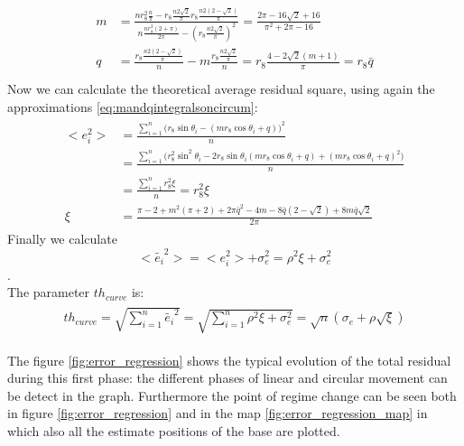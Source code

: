 \begin{itemize}
\begin{itemize}
\begin{align}
\begin{split}
m &= \frac{nr_{8}^2\frac{n}{\pi} - r_{8}\frac{n2\sqrt{2}}{\pi} r_{8}\frac{n2(2-\sqrt{2})}{\pi} }{n\frac{nr_{8}^2(2+\pi)}{2\pi} -(r_{8}\frac{n2\sqrt{2}}{\pi})^2} = \frac{2\pi - 16\sqrt{2} + 16}{\pi^2 + 2\pi - 16}  \\
q &= \frac{ r_{8}\frac{n2(2-\sqrt{2})}{\pi} }{n} - m\frac{ r_{8}\frac{n2\sqrt{2}}{\pi}}{n} = r_{8} \frac{4-2\sqrt{2}(m+1)}{\pi} = r_{8}\bar{q} \\
\end{split}
\label{eq:mandqcirum}
\end{align}
Now we can calculate the theoretical average residual square, using again the approximations  \ref{eq:mandqintegralsoncircum}:
\begin{align*}
\begin{split}
<e_i^2> &= \frac{\sum_{i = 1}^{n}{\Big(r_{8}\sin{\theta_i} - (mr_{8}\cos{\theta_i} + q)\Big)^2}}{n}\\
&= \frac{\sum_{i = 1}^{n}{\Big(r_{8}^2\sin^2{\theta_i} - 2r_{8}\sin{\theta_i}(mr_{8}\cos{\theta_i} + q) + (mr_{8}\cos{\theta_i} + q)^2\Big)}}{n}\\
& = \frac{\sum_{i = 1}^{n} r_{8}^2 \xi }{n} = r_{8}^2 \xi \\
\xi &= \frac{\pi - 2 + m^2(\pi+2) + 2\pi\bar{q}^2 - 4m -8\bar{q}(2-\sqrt{2}) + 8m\bar{q}\sqrt{2}}{2\pi}
\end{split}
\end{align*} 
Finally we calculate $$<\tilde{e_i}^2>  = <e_i^2> + \sigma_e^2 = \rho^2 \xi  + \sigma_e^2 $$. \\
The parameter $th_{curve}$ is:
\begin{align}
\begin{split}
th_{curve} = \sqrt{\sum_{i=1}^{n}{\tilde{e_i}^2}} = \sqrt{\sum_{i=1}^{n}{\rho^2 \xi  + \sigma_e^2}} = \sqrt{n}(\sigma_e + \rho\sqrt{\xi})
\end{split}
\end{align}
\end{itemize}
\end{itemize}
The figure \ref{fig:error_regression} shows the typical evolution of the total residual during this first phase: the different phases of linear and circular movement can be detect in the graph. Furthermore the point of regime change can be seen both in figure \ref{fig:error_regression}  and in the map \ref{fig:error_regression_map} in which also all the estimate positions of the base are plotted.\\


